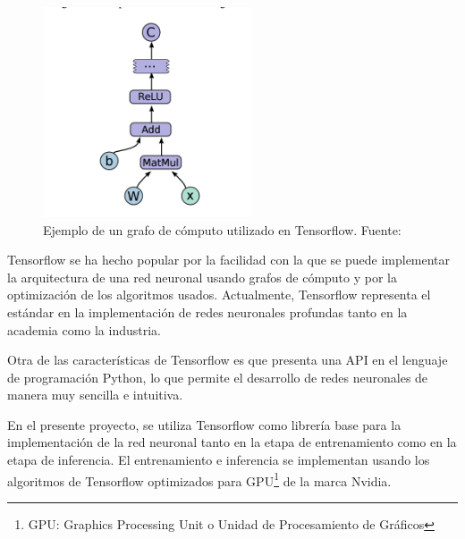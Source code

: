     \begin{figure}[!h] 
        \centering
        \includegraphics[width=0.55\textwidth]{img/grafotf}
        \caption[Ejemplo de un grafo de cómputo utilizado en Tensorflow]{Ejemplo de un grafo de cómputo utilizado en Tensorflow. Fuente: \cite{asjad_2016} }
        \label{fig:grafotf}
    \end{figure}

    Tensorflow se ha hecho popular por la facilidad con la que se puede implementar la arquitectura de una red neuronal usando grafos
    de cómputo y por la optimización de los algoritmos usados. Actualmente, Tensorflow representa el estándar en la implementación de 
    redes neuronales profundas tanto en la academia como la industria. 

    Otra de las características de Tensorflow es que presenta una API en el lenguaje de programación Python, lo que permite el desarrollo
    de redes neuronales de manera muy sencilla e intuitiva. 

    En el presente proyecto, se utiliza Tensorflow como librería base para la implementación de la red neuronal tanto en la etapa de 
    entrenamiento como en la etapa de inferencia. El entrenamiento e inferencia se implementan usando los algoritmos de Tensorflow 
    optimizados para GPU\footnote{GPU: Graphics Processing Unit o Unidad de Procesamiento de Gráficos} de la marca Nvidia.%

